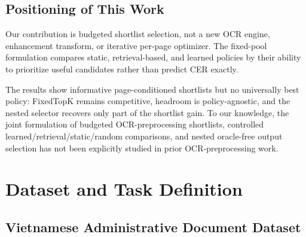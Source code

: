 \documentclass[pdflatex,sn-basic,Numbered,iicol]{sn-jnl}
\begin{document}
\subsection{Positioning of This Work}

Our contribution is budgeted shortlist selection, not a new OCR engine, enhancement transform, or iterative per-page optimizer. The fixed-pool formulation compares static, retrieval-based, and learned policies by their ability to prioritize useful candidates rather than predict CER exactly.

The results show informative page-conditioned shortlists but no universally best policy: FixedTopK remains competitive, headroom is policy-agnostic, and the nested selector recovers only part of the shortlist gain. To our knowledge, the joint formulation of budgeted OCR-preprocessing shortlists, controlled learned/retrieval/static/random comparisons, and nested oracle-free output selection has not been explicitly studied in prior OCR-preprocessing work.

\section{Dataset and Task Definition}
\label{sec:dataset_problem}

\subsection{Vietnamese Administrative Document Dataset}
\end{document}
